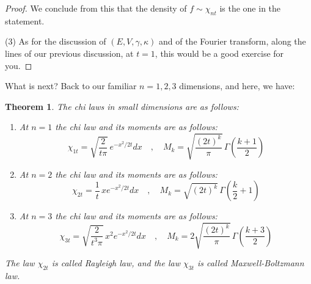 \documentclass[12pt]{amsbook}
\newtheorem{theorem}{Theorem}[chapter]
\begin{document}
\begin{proof}
We conclude from this that the density of $f\sim\chi_{nt}$ is the one in the statement.

\medskip

(3) As for the discussion of $(E,V,\gamma,\kappa)$ and of the Fourier transform, along the lines of our previous discussion, at $t=1$, this would be a good exercise for you.
\end{proof}

What is next? Back to our familiar $n=1,2,3$ dimensions, and here, we have:


\begin{theorem}
The chi laws in small dimensions are as follows:
\begin{enumerate}
\item At $n=1$ the chi law and its moments are as follows:
$$\chi_{1t}=\sqrt{\frac{2}{t\pi}}\,e^{-x^2/2t}dx\quad,\quad 
M_k=\sqrt{\frac{(2t)^k}{\pi}}\,\Gamma\left(\frac{k+1}{2}\right)$$

\item At $n=2$ the chi law and its moments are as follows:
$$\chi_{2t}=\frac{1}{t}\,xe^{-x^2/2t}dx\quad,\quad 
M_k=\sqrt{(2t)^k}\,\Gamma\left(\frac{k}{2}+1\right)$$

\item At $n=3$ the chi law and its moments are as follows:
$$\chi_{3t}=\sqrt{\frac{2}{t^3\pi}}\,x^2e^{-x^2/2t}dx\quad,\quad 
M_k=2\sqrt{\frac{(2t)^k}{\pi}}\,\Gamma\left(\frac{k+3}{2}\right)$$
\end{enumerate}
The law $\chi_{2t}$ is called Rayleigh law, and the law $\chi_{3t}$ is called Maxwell-Boltzmann law.
\end{theorem}
\end{document}
